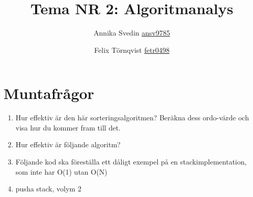 \documentclass[a5paper,10pt,oneside]{article}
\title{Tema NR 2: Algoritmanalys}
\author{Annika Svedin \url{ansv9785} \and Felix Törnqvist \url{fetr0498}}
\begin{document}
\maketitle

\section*{Muntafrågor}

\begin{enumerate}


\item Hur effektiv är den här sorteringsalgoritmen? Beräkna dess ordo-värde och visa hur du kommer fram till det.




\item Hur effektiv är följande algoritm?


\item Följande kod ska föreställa ett dåligt exempel på en stackimplementation, som inte har O(1) utan O(N)



\item pusha stack, volym 2



\end{enumerate}
\end{document}

